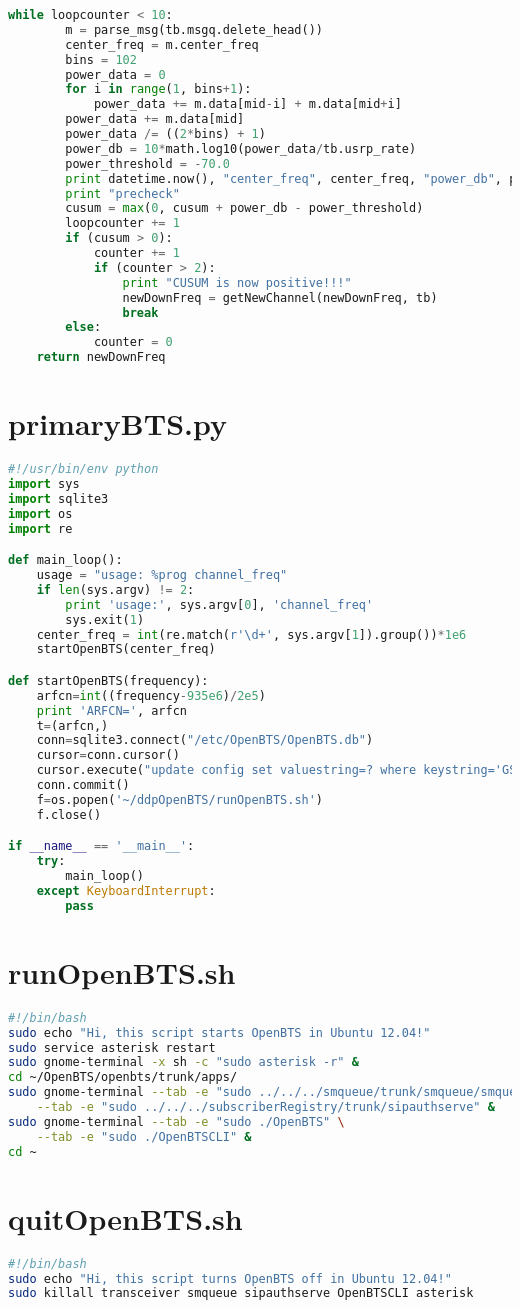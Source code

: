 \begin{lstlisting}[language=Python]
    while loopcounter < 10:
        m = parse_msg(tb.msgq.delete_head())
        center_freq = m.center_freq
        bins = 102
        power_data = 0
        for i in range(1, bins+1):
            power_data += m.data[mid-i] + m.data[mid+i]
        power_data += m.data[mid]
        power_data /= ((2*bins) + 1)
        power_db = 10*math.log10(power_data/tb.usrp_rate)
        power_threshold = -70.0
        print datetime.now(), "center_freq", center_freq, "power_db", power_db
        print "precheck"
        cusum = max(0, cusum + power_db - power_threshold)
        loopcounter += 1
        if (cusum > 0):
            counter += 1
            if (counter > 2):
                print "CUSUM is now positive!!!"
                newDownFreq = getNewChannel(newDownFreq, tb)
                break
        else:
            counter = 0
    return newDownFreq
\end{lstlisting}




\section{primaryBTS.py}
\begin{lstlisting}[language=Python]
#!/usr/bin/env python
import sys
import sqlite3
import os
import re

def main_loop():
    usage = "usage: %prog channel_freq"
    if len(sys.argv) != 2:
        print 'usage:', sys.argv[0], 'channel_freq'
        sys.exit(1)
    center_freq = int(re.match(r'\d+', sys.argv[1]).group())*1e6
    startOpenBTS(center_freq)

def startOpenBTS(frequency):            
    arfcn=int((frequency-935e6)/2e5)
    print 'ARFCN=', arfcn
    t=(arfcn,)
    conn=sqlite3.connect("/etc/OpenBTS/OpenBTS.db")
    cursor=conn.cursor()
    cursor.execute("update config set valuestring=? where keystring='GSM.Radio.C0'",t)
    conn.commit()
    f=os.popen('~/ddpOpenBTS/runOpenBTS.sh')
    f.close()

if __name__ == '__main__':
    try:
        main_loop()
    except KeyboardInterrupt:
        pass
\end{lstlisting}


\section{runOpenBTS.sh}
\begin{lstlisting}[language=bash]
#!/bin/bash
sudo echo "Hi, this script starts OpenBTS in Ubuntu 12.04!"
sudo service asterisk restart
sudo gnome-terminal -x sh -c "sudo asterisk -r" &
cd ~/OpenBTS/openbts/trunk/apps/
sudo gnome-terminal --tab -e "sudo ../../../smqueue/trunk/smqueue/smqueue" \
    --tab -e "sudo ../../../subscriberRegistry/trunk/sipauthserve" &
sudo gnome-terminal --tab -e "sudo ./OpenBTS" \
    --tab -e "sudo ./OpenBTSCLI" &
cd ~
\end{lstlisting}


\section{quitOpenBTS.sh}
\begin{lstlisting}[language=bash]
#!/bin/bash
sudo echo "Hi, this script turns OpenBTS off in Ubuntu 12.04!"
sudo killall transceiver smqueue sipauthserve OpenBTSCLI asterisk
\end{lstlisting}

